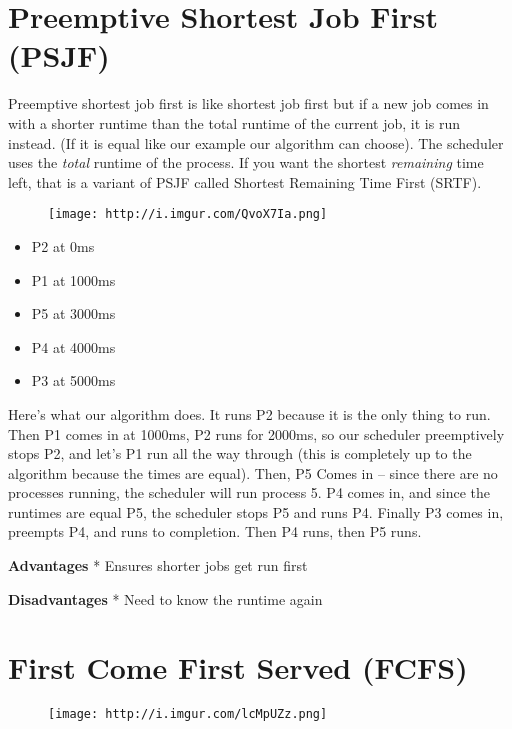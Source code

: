 \section{Preemptive Shortest Job First
(PSJF)}\label{preemptive-shortest-job-first-psjf}

Preemptive shortest job first is like shortest job first but if a new
job comes in with a shorter runtime than the total runtime of the
current job, it is run instead. (If it is equal like our example our
algorithm can choose). The scheduler uses the \emph{total} runtime of
the process. If you want the shortest \emph{remaining} time left, that
is a variant of PSJF called Shortest Remaining Time First (SRTF).

\begin{figure}[htbp]
\centering
\texttt{[image: http://i.imgur.com/QvoX7Ia.png]}
\caption{}
\end{figure}

\begin{itemize}
\tightlist
\item
  P2 at 0ms
\item
  P1 at 1000ms
\item
  P5 at 3000ms
\item
  P4 at 4000ms
\item
  P3 at 5000ms
\end{itemize}

Here's what our algorithm does. It runs P2 because it is the only thing
to run. Then P1 comes in at 1000ms, P2 runs for 2000ms, so our scheduler
preemptively stops P2, and let's P1 run all the way through (this is
completely up to the algorithm because the times are equal). Then, P5
Comes in -- since there are no processes running, the scheduler will run
process 5. P4 comes in, and since the runtimes are equal P5, the
scheduler stops P5 and runs P4. Finally P3 comes in, preempts P4, and
runs to completion. Then P4 runs, then P5 runs.

\textbf{Advantages} * Ensures shorter jobs get run first

\textbf{Disadvantages} * Need to know the runtime again

\section{First Come First Served
(FCFS)}\label{first-come-first-served-fcfs}

\begin{figure}[htbp]
\centering
\texttt{[image: http://i.imgur.com/lcMpUZz.png]}
\caption{}
\end{figure}

